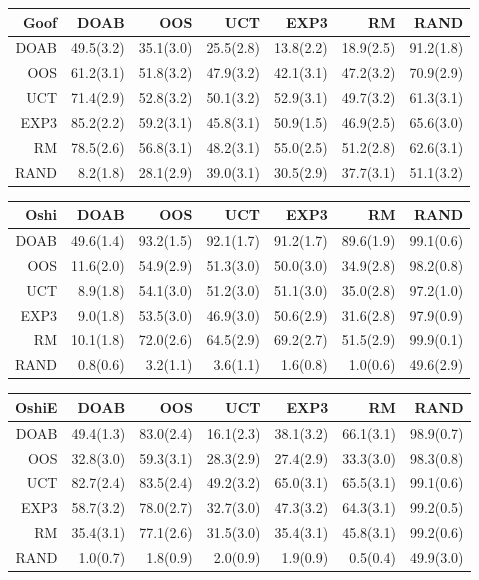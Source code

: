 \begin{figure}
\centering
\begin{footnotesize}
\begin{tabular}{|r|rrrrrr|}\hline
Goof&DOAB&OOS&UCT&EXP3&RM&RAND\\\hline
DOAB&49.5(3.2)&35.1(3.0)&25.5(2.8)&13.8(2.2)&18.9(2.5)&91.2(1.8)\\
OOS&61.2(3.1)&51.8(3.2)&47.9(3.2)&42.1(3.1)&47.2(3.2)&70.9(2.9)\\
UCT&71.4(2.9)&52.8(3.2)&50.1(3.2)&52.9(3.1)&49.7(3.2)&61.3(3.1)\\
EXP3&85.2(2.2)&59.2(3.1)&45.8(3.1)&50.9(1.5)&46.9(2.5)&65.6(3.0)\\
RM&78.5(2.6)&56.8(3.1)&48.2(3.1)&55.0(2.5)&51.2(2.8)&62.6(3.1)\\
RAND&8.2(1.8)&28.1(2.9)&39.0(3.1)&30.5(2.9)&37.7(3.1)&51.1(3.2)\\
\hline
\end{tabular}


\begin{tabular}{|r|rrrrrr|}\hline
Oshi&DOAB&OOS&UCT&EXP3&RM&RAND\\\hline
DOAB&49.6(1.4)&93.2(1.5)&92.1(1.7)&91.2(1.7)&89.6(1.9)&99.1(0.6)\\
OOS&11.6(2.0)&54.9(2.9)&51.3(3.0)&50.0(3.0)&34.9(2.8)&98.2(0.8)\\
UCT&8.9(1.8)&54.1(3.0)&51.2(3.0)&51.1(3.0)&35.0(2.8)&97.2(1.0)\\
EXP3&9.0(1.8)&53.5(3.0)&46.9(3.0)&50.6(2.9)&31.6(2.8)&97.9(0.9)\\
RM&10.1(1.8)&72.0(2.6)&64.5(2.9)&69.2(2.7)&51.5(2.9)&99.9(0.1)\\
RAND&0.8(0.6)&3.2(1.1)&3.6(1.1)&1.6(0.8)&1.0(0.6)&49.6(2.9)\\
\hline
\end{tabular}

\begin{tabular}{|r|rrrrrr|}\hline
OshiE&DOAB&OOS&UCT&EXP3&RM&RAND\\\hline
DOAB&49.4(1.3)&83.0(2.4)&16.1(2.3)&38.1(3.2)&66.1(3.1)&98.9(0.7)\\
OOS&32.8(3.0)&59.3(3.1)&28.3(2.9)&27.4(2.9)&33.3(3.0)&98.3(0.8)\\
UCT&82.7(2.4)&83.5(2.4)&49.2(3.2)&65.0(3.1)&65.5(3.1)&99.1(0.6)\\
EXP3&58.7(3.2)&78.0(2.7)&32.7(3.0)&47.3(3.2)&64.3(3.1)&99.2(0.5)\\
RM&35.4(3.1)&77.1(2.6)&31.5(3.0)&35.4(3.1)&45.8(3.1)&99.2(0.6)\\
RAND&1.0(0.7)&1.8(0.9)&2.0(0.9)&1.9(0.9)&0.5(0.4)&49.9(3.0)\\
\hline
\end{tabular}


\end{footnotesize}
\end{figure}
